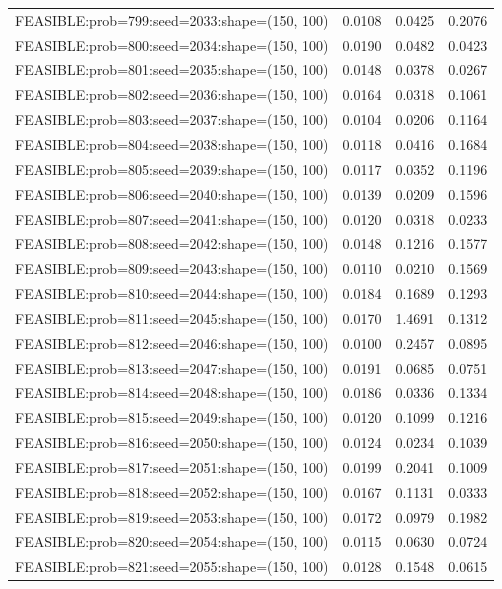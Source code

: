 \begin{longtable}{lccc}
FEASIBLE:prob=799:seed=2033:shape=(150, 100) & 0.0108 & 0.0425 & 0.2076 \\
FEASIBLE:prob=800:seed=2034:shape=(150, 100) & 0.0190 & 0.0482 & 0.0423 \\
FEASIBLE:prob=801:seed=2035:shape=(150, 100) & 0.0148 & 0.0378 & 0.0267 \\
FEASIBLE:prob=802:seed=2036:shape=(150, 100) & 0.0164 & 0.0318 & 0.1061 \\
FEASIBLE:prob=803:seed=2037:shape=(150, 100) & 0.0104 & 0.0206 & 0.1164 \\
FEASIBLE:prob=804:seed=2038:shape=(150, 100) & 0.0118 & 0.0416 & 0.1684 \\
FEASIBLE:prob=805:seed=2039:shape=(150, 100) & 0.0117 & 0.0352 & 0.1196 \\
FEASIBLE:prob=806:seed=2040:shape=(150, 100) & 0.0139 & 0.0209 & 0.1596 \\
FEASIBLE:prob=807:seed=2041:shape=(150, 100) & 0.0120 & 0.0318 & 0.0233 \\
FEASIBLE:prob=808:seed=2042:shape=(150, 100) & 0.0148 & 0.1216 & 0.1577 \\
FEASIBLE:prob=809:seed=2043:shape=(150, 100) & 0.0110 & 0.0210 & 0.1569 \\
FEASIBLE:prob=810:seed=2044:shape=(150, 100) & 0.0184 & 0.1689 & 0.1293 \\
FEASIBLE:prob=811:seed=2045:shape=(150, 100) & 0.0170 & 1.4691 & 0.1312 \\
FEASIBLE:prob=812:seed=2046:shape=(150, 100) & 0.0100 & 0.2457 & 0.0895 \\
FEASIBLE:prob=813:seed=2047:shape=(150, 100) & 0.0191 & 0.0685 & 0.0751 \\
FEASIBLE:prob=814:seed=2048:shape=(150, 100) & 0.0186 & 0.0336 & 0.1334 \\
FEASIBLE:prob=815:seed=2049:shape=(150, 100) & 0.0120 & 0.1099 & 0.1216 \\
FEASIBLE:prob=816:seed=2050:shape=(150, 100) & 0.0124 & 0.0234 & 0.1039 \\
FEASIBLE:prob=817:seed=2051:shape=(150, 100) & 0.0199 & 0.2041 & 0.1009 \\
FEASIBLE:prob=818:seed=2052:shape=(150, 100) & 0.0167 & 0.1131 & 0.0333 \\
FEASIBLE:prob=819:seed=2053:shape=(150, 100) & 0.0172 & 0.0979 & 0.1982 \\
FEASIBLE:prob=820:seed=2054:shape=(150, 100) & 0.0115 & 0.0630 & 0.0724 \\
FEASIBLE:prob=821:seed=2055:shape=(150, 100) & 0.0128 & 0.1548 & 0.0615 \\

\end{longtable}
